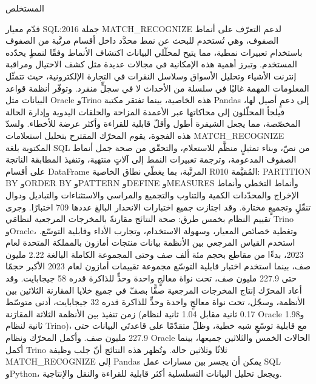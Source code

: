 \documentclass[12pt,a4paper]{article}
\newcommand{\SizeHeading}{\fontsize{18pt}{28pt}\selectfont} %
\newcommand{\SizeBody}   {\fontsize{12pt}{21pt}\selectfont} %
\newcommand{\LeadBody}{\setstretch{1.0}}
\newcommand{\en}[1]{\textenglish{#1}}
\begin{document}
\begin{center}
  {\SizeHeading المستخلص}
\end{center}

\vspace{0.8\baselineskip}

{\LeadBody\SizeBody

قدّم معيار \en{SQL:2016} جملة \en{MATCH\_RECOGNIZE} لدعم التعرّف على أنماط
الصفوف، وهي تُستخدم للبحث عن نمط محدَّد داخل أقسام مرتَّبة من الصفوف باستخدام
تعبيرات نمطية، مما يتيح لمحلّلي البيانات اكتشاف الأنماط وفقًا لنمطٍ يحدّده
المستخدم. وتبرز أهمية هذه الإمكانية في مجالات عديدة مثل كشف الاحتيال ومراقبة
إنترنت الأشياء وتحليل الأسواق وسلاسل النقرات في التجارة الإلكترونية، حيث
تتمثّل المعلومات المهمة غالبًا في سلسلة من الأحداث لا في سجلٍّ منفرد. وتوفّر
أنظمة قواعد البيانات مثل \en{Oracle} و\en{Trino} هذه الخاصية، بينما تفتقر
مكتبة \en{Pandas} إلى دعمٍ أصيل لها، فيلجأ المحلّلون إلى محاكاتها عبر الأعمدة
المزاحة والحلقات اليدوية وإدارة الحالة المخصّصة، مما يجعل الشيفرة أطول وأقلّ
قابلية للقراءة وأكثر عرضة للأخطاء. ولسدّ هذه الفجوة، يقوم المحرّك المقترح
بتحليل استعلامات \en{MATCH\_RECOGNIZE} المكتوبة بلغة \en{SQL} من نصّ، وبناء
تمثيلٍ منظَّم للاستعلام، والتحقّق من صحة جمل أنماط الصفوف المدعومة، وترجمة
تعبيرات النمط إلى آلاتٍ منتهية، وتنفيذ المطابقة الناتجة على أقسام
\en{DataFrame} المرتَّبة، بما يغطّي نطاق الخاصية \en{R010} المُقيَّمة:
\en{PARTITION BY} و\en{ORDER BY} و\en{PATTERN} و\en{DEFINE} و\en{MEASURES}
وأنماط التخطي وأنماط الإخراج والمحدّدات الكمية والتناوب والتجميع والمراسي
والاستثناءات والتباديل ودوال تنقّلٍ وتجميعٍ مختارة. وقد اجتازت جميع اختبارات
الانحدار البالغ عددها \en{709} اختبارًا. وجرى تقييم النظام بخمس طرق: صحة
النتائج مقارنةً بالمخرجات المرجعية لنظامَي \en{Trino} و\en{Oracle}، وتغطية
خصائص المعيار، وسهولة الاستخدام، وتجارب الأداء وقابلية التوسّع. استخدم القياس
المرجعي بين الأنظمة بيانات منتجات أمازون بالمملكة المتحدة لعام \en{2023}،
بدءًا من مقاطع بحجم مئة ألف صف وحتى المجموعة الكاملة البالغة \en{2.22} مليون
صف، بينما استخدم اختبار قابلية التوسّع مجموعة تقييمات أمازون لعام \en{2023}
الأكبر حجمًا حتى \en{227.9} مليون صف، تحت نواة معالجٍ واحدة وحدٍّ للذاكرة قدره
\en{58} جيجابايت. وقد أعاد المحرّك إنتاج المخرجات المرجعية صفًّا بصفّ في جميع
خلايا المقارنة الثلاثين بين الأنظمة، وسجّل، تحت نواة معالجٍ واحدة وحدٍّ
للذاكرة قدره \en{32} جيجابايت، أدنى متوسّط زمن تنفيذ بين الأنظمة الثلاثة
المقارَنة (\en{0.17} ثانية مقابل \en{1.04} ثانية لنظام \en{Oracle}
و\en{1.98} ثانية لنظام \en{Trino})، مع قابلية توسّعٍ شبه خطية، وظلّ متقدّمًا
على قاعدتَي البيانات حتى \en{227.9} مليون صف. وأكمل المحرّك ونظام \en{Oracle}
الحالات الخمس والثلاثين جميعها، بينما أكمل \en{Trino} ثلاثًا وثلاثين حالة.
وتُظهر هذه النتائج أنّ جلب وظيفة \en{MATCH\_RECOGNIZE} إلى \en{Pandas} يمكن
أن يجسر بين مسارات عمل \en{SQL} و\en{Python}، ويجعل تحليل البيانات التسلسلية
أكثر قابلية للقراءة والنقل والإنتاجية.

}
\end{document}

